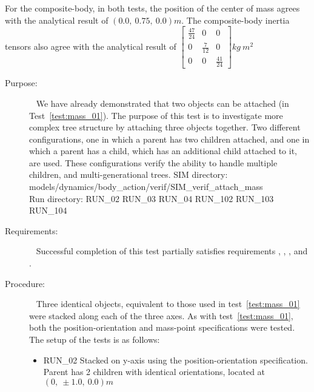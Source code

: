 \begin{description}
For the composite-body, in both tests, the position of the center of mass
agrees with the analytical result of $(0.0,~0.75,~0.0) m$.  The composite-body
inertia tensors also agree with the analytical result of $\begin{bmatrix}
\frac{47}{24} & 0 & 0 \\ 0 & \frac{7}{12} & 0 \\ 0 & 0 & \frac{41}{24}
\end{bmatrix} kg ~ m^2$

\end{description}

\clearpage






\label{test:mass_02}
\begin{description}
\item[Purpose:] \ \newline
We have already demonstrated that two objects can be attached (in
Test~\ref{test:mass_01}).  The purpose of this test is to investigate more
complex tree structure by attaching three objects together.  Two different
configurations, one in which a parent has two children attached, and one in
which a parent has a child, which has an additional child attached to it, are
used.  These configurations verify the ability to handle multiple children,
and multi-generational trees.
\newline
SIM directory: models/dynamics/body\_action/verif/SIM\_verif\_attach\_mass\\
Run directory: RUN\_02 RUN\_03 RUN\_04  RUN\_102 RUN\_103 RUN\_104
\item[Requirements:] \ \newline
Successful completion of this test partially satisfies
requirements , ,
, and .
\item[Procedure:]\ \newline
Three identical objects, equivalent to those used in
test~\ref{test:mass_01} were stacked along each of the three axes.  As with
test~\ref{test:mass_01}, both the position-orientation and mass-point
specifications were tested.  The setup of the tests is as follows:
\begin{itemize}
 \item RUN\_02 Stacked on y-axis using the position-orientation specification.
 Parent
 has 2 children with identical orientations, located at $(0,~\pm1.0,~0.0) m$

\end{itemize}
\end{description}
